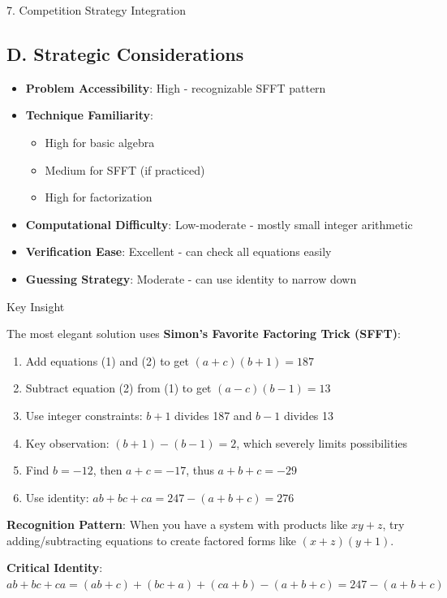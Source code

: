 \documentclass[12pt]{article}
\begin{document}
\begin{competitionbox}{7. Competition Strategy Integration}
\subsection*{D. Strategic Considerations}
\begin{itemize}[leftmargin=*]
    \item \textbf{Problem Accessibility}: High - recognizable SFFT pattern
    \item \textbf{Technique Familiarity}: 
    \begin{itemize}
        \item High for basic algebra
        \item Medium for SFFT (if practiced)
        \item High for factorization
    \end{itemize}
    \item \textbf{Computational Difficulty}: Low-moderate - mostly small integer arithmetic
    \item \textbf{Verification Ease}: Excellent - can check all equations easily
    \item \textbf{Guessing Strategy}: Moderate - can use identity to narrow down
\end{itemize}

\end{competitionbox}

\begin{highlightbox}{Key Insight}

The most elegant solution uses \textbf{Simon's Favorite Factoring Trick (SFFT)}:
\begin{enumerate}
    \item Add equations (1) and (2) to get $(a+c)(b+1) = 187$
    \item Subtract equation (2) from (1) to get $(a-c)(b-1) = 13$
    \item Use integer constraints: $b+1$ divides 187 and $b-1$ divides 13
    \item Key observation: $(b+1) - (b-1) = 2$, which severely limits possibilities
    \item Find $b = -12$, then $a+c = -17$, thus $a+b+c = -29$
    \item Use identity: $ab + bc + ca = 247 - (a+b+c) = 276$
\end{enumerate}

\vspace{0.5em}
\noindent\textbf{Recognition Pattern}: When you have a system with products like $xy + z$, try adding/subtracting equations to create factored forms like $(x+z)(y+1)$.

\vspace{0.5em}
\noindent\textbf{Critical Identity}: $ab + bc + ca = (ab+c) + (bc+a) + (ca+b) - (a+b+c) = 247 - (a+b+c)$

\end{highlightbox}
\end{document}
